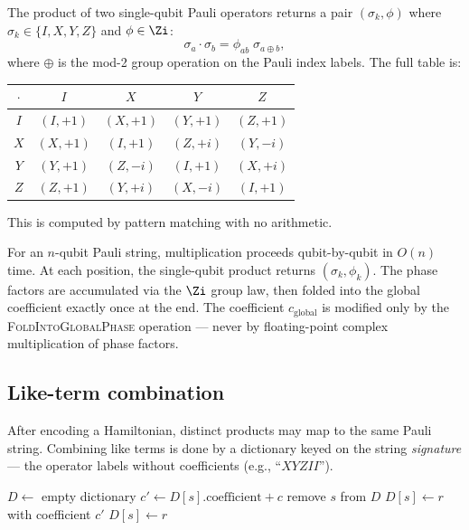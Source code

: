 The product of two single-qubit Pauli operators returns a pair
$(\sigma_k, \phi)$ where $\sigma_k \in \{I, X, Y, Z\}$ and
$\phi \in \Zi$:
\begin{equation}
  \sigma_a \cdot \sigma_b = \phi_{ab}\; \sigma_{a \oplus b},
  \label{eq:pauli-product}
\end{equation}
where $\oplus$ is the mod-2 group operation on the Pauli index
labels.  The full table is:
\begin{center}
\begin{tabular}{@{}c|cccc@{}}
$\cdot$ & $I$ & $X$ & $Y$ & $Z$ \\
\midrule
$I$ & $(I,+1)$ & $(X,+1)$ & $(Y,+1)$ & $(Z,+1)$ \\
$X$ & $(X,+1)$ & $(I,+1)$ & $(Z,+i)$ & $(Y,-i)$ \\
$Y$ & $(Y,+1)$ & $(Z,-i)$ & $(I,+1)$ & $(X,+i)$ \\
$Z$ & $(Z,+1)$ & $(Y,+i)$ & $(X,-i)$ & $(I,+1)$ \\
\end{tabular}
\end{center}
This is computed by pattern matching with no arithmetic.

For an $n$-qubit Pauli string, multiplication proceeds qubit-by-qubit
in $O(n)$ time.  At each position, the single-qubit product returns
$(\sigma_k, \phi_k)$.  The phase factors are accumulated via the
$\Zi$ group law, then folded into the global coefficient exactly once
at the end.  The coefficient $c_\text{global}$ is modified only by
the \textsc{FoldIntoGlobalPhase} operation — never by floating-point
complex multiplication of phase factors.

\subsection{Like-term combination}
\label{sec:ex-combination}

After encoding a Hamiltonian, distinct products may map to the same
Pauli string.  Combining like terms is done by a dictionary keyed on
the string \emph{signature} — the operator labels without coefficients
(e.g., ``$XYZII$'').

\begin{algorithm}[t]
\caption{Like-term combination}
\label{alg:like-term}
\begin{algorithmic}[1]
\State $D \gets$ empty dictionary
    \State $c' \gets D[s].\text{coefficient} + c$
      \State remove $s$ from $D$ 
    \Else
      \State $D[s] \gets r$ with coefficient $c'$
    \EndIf
  \Else
    \State $D[s] \gets r$
  \EndIf
\EndFor
\end{algorithmic}
\end{algorithm}

